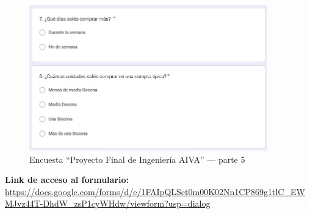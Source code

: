 \begin{figure}[p]
  \centering
  \includegraphics[width=0.92\textwidth]{images/encuesta_p5.png}
  \caption{Encuesta “Proyecto Final de Ingeniería AIVA” — parte 5}
  \label{fig:encuesta-aiva-5}
\end{figure}

\noindent\textbf{Link de acceso al formulario:}
\url{https://docs.google.com/forms/d/e/1FAIpQLSct0m00K02Nn1CP869g1tlC_EWMJvz44T-DhdW_zsP1cyWHdw/viewform?usp=dialog} %
\bigskip